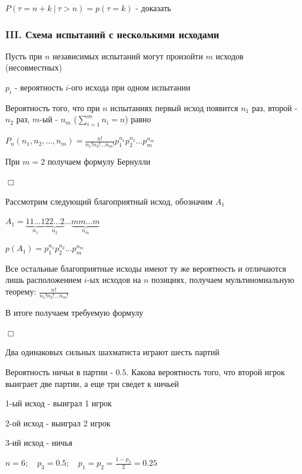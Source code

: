 \documentclass[12pt]{article}
\begin{document}
    \Nota $P(\tau = n + k \ | \ \tau > n) = p(\tau = k)$ - \Lab доказать

    \subsubsection{III. Схема испытаний с несколькими исходами}

    Пусть при $n$ независимых испытаний могут произойти $m$ исходов (несовместных)

    $p_i$ - вероятность $i$-ого исхода при одном испытании

    \begin{MyTheorem}
        \Ths Вероятность того, что при $n$ испытаниях первый исход появится $n_1$ раз, второй - $n_2$ раз, $m$-ый - $n_m$ ($\sum_{i = 1}^m n_i = n$)
        равно

        $P_n(n_1, n_2, \dots, n_m) = \frac{n!}{n_1! n_2! \dots n_m!} p_1^{n_1} p_2^{n_2} \dots p_m^{n_m}$
    \end{MyTheorem}

    При $m = 2$ получаем формулу Бернулли

    \begin{MyProof}
        $\Box$

        Рассмотрим следующий благоприятный исход, обозначим $A_1$

        $A_1 = \underset{n_1}{\underbrace{11\dots1}}\underset{n_2}{\underbrace{22\dots2}}\dots\underset{n_m}{\underbrace{mm\dots m}}$

        $p(A_1) = p_1^{n_1} p_2^{n_2} \dots p_m^{n_m}$

        Все остальные благоприятные исходы имеют ту же вероятность и отличаются лишь расположением $i$-ых исходов на $n$ позициях,
        получаем мультиномиальную теорему: $\frac{n!}{n_1! n_2! \dots n_m!}$

        В итоге получаем требуемую формулу

        $\Box$
    \end{MyProof}

    \Ex Два одинаковых сильных шахматиста играют шесть партий

    Вероятность ничьи в партии - $0.5$. Какова вероятность того, что второй игрок выиграет две партии, а еще три сведет к ничьей

    1-ый исход - выиграл 1 игрок

    2-ой исход - выиграл 2 игрок

    3-ий исход - ничья

    $n = 6; \quad p_3 = 0.5; \quad p_1 = p_2 = \frac{1 - p_3}{2} = 0.25$
\end{document}
